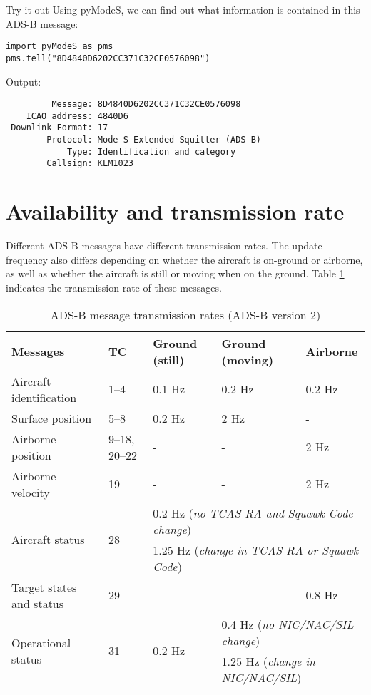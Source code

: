 \begin{notebox}{Try it out}
  Using pyModeS, we can find out what information is contained in this ADS-B message:

\begin{verbatim}
import pyModeS as pms
pms.tell("8D4840D6202CC371C32CE0576098")
\end{verbatim}

Output:

\begin{verbatim}
         Message: 8D4840D6202CC371C32CE0576098 
    ICAO address: 4840D6 
 Downlink Format: 17 
        Protocol: Mode S Extended Squitter (ADS-B) 
            Type: Identification and category 
        Callsign: KLM1023_ 
\end{verbatim}
  

\end{notebox}


\section{Availability and transmission rate}

Different ADS-B messages have different transmission rates. The update frequency also differs depending on whether the aircraft is on-ground or airborne, as well as whether the aircraft is still or moving when on the ground. Table \ref{tb:adsb-transmission-rate} indicates the transmission rate of these messages.

\begin{table}[ht]
  \footnotesize
  \centering
  \caption{ADS-B message transmission rates (ADS-B version 2)}
  \label{tb:adsb-transmission-rate}
  \begin{tabular}{|l|l|l|l|l|}
  \hline
  \textbf{Messages} & \textbf{TC} & \textbf{Ground (still)} & \textbf{Ground (moving)} & \textbf{Airborne} \\ \hline
  Aircraft identification & 1--4 & 0.1 Hz & 0.2 Hz & 0.2 Hz \\ \hline
  Surface position & 5--8 & 0.2 Hz & 2 Hz & - \\ \hline
  Airborne position & 9--18, 20--22 & - & - & 2 Hz \\ \hline
  Airborne velocity & 19 & - & - & 2 Hz \\ \hline
  \multirow{2}{*}{Aircraft status} & \multirow{2}{*}{28} & \multicolumn{3}{l|}{0.2 Hz (\textit{no TCAS RA and Squawk Code change})} \\ \cline{3-5} 
   &  & \multicolumn{3}{l|}{1.25 Hz (\textit{change in TCAS RA or Squawk Code})} \\ \hline
  Target states and status & 29 & - & - & 0.8 Hz \\ \hline
  \multirow{2}{*}{Operational status} & \multirow{2}{*}{31} & \multirow{2}{*}{0.2 Hz} & \multicolumn{2}{l|}{0.4 Hz (\textit{no NIC/NAC/SIL change})} \\ \cline{4-5} 
   &  &  & \multicolumn{2}{l|}{1.25 Hz (\textit{change in NIC/NAC/SIL})} \\ \hline
  \end{tabular}
\end{table}

